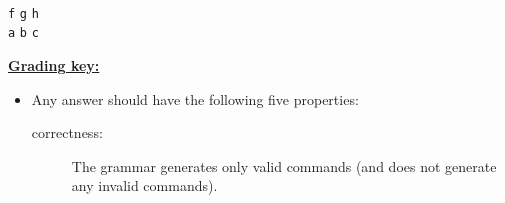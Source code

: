 \documentclass[11pt,fleqn]{article}
\begin{document}
\begin{enumerate}
\begin{multicols}{2}
            \smallskip

            \hspace{.2in}
            \begin{minipage}[t]{2.9in}

              \begin{grammar}[2]

                \\

                \\

                \\

                           {\texttt{f} \midspc \texttt{g} \midspc \texttt{h}}
                \\

                           {\texttt{a} \midspc \texttt{b} \midspc \texttt{c}}
                \\

              \end{grammar}

            \end{minipage}

          \end{multicols}

          \vspace{-5mm}

          \enlargethispage{5mm}

          \begin{info}{\textbf{\underline{Grading key:}}}

            \begin{itemize}

              \addtolength{\itemsep}{1.5mm}

              \item Any answer should have the following five properties:

                    \vspace{.5mm}

                    \begin{description}

                      \item[correctness:] The grammar generates only valid
                            commands (and does not generate any invalid
                            commands).


\end{description}
\end{itemize}
\end{info}
\end{enumerate}
\end{document}
